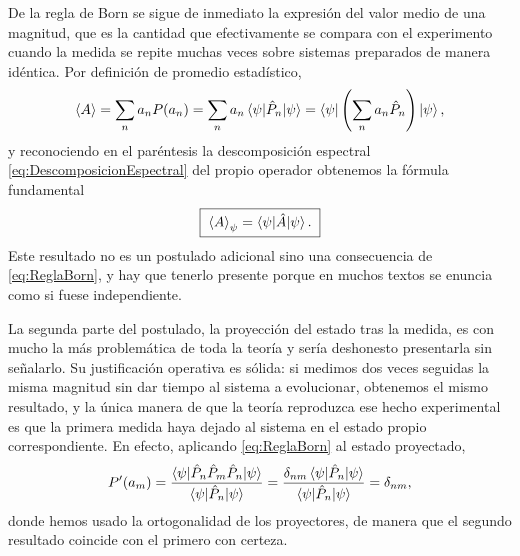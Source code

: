         De la regla de Born se sigue de inmediato la expresión del valor medio de una magnitud, que es la cantidad que efectivamente se compara con el experimento cuando la medida se repite muchas veces sobre sistemas preparados de manera idéntica. Por definición de promedio estadístico,
        \begin{equation}\label{eq:ValorMedio1}
            \left\langle A\right\rangle = \sum_{n} a_{n}P(a_{n}) = \sum_{n}a_{n}\braket{\psi|\hat{P}_{n}|\psi} = \braket{\psi|\left(\sum_{n}a_{n}\hat{P}_{n}\right)|\psi},
        \end{equation}
        y reconociendo en el paréntesis la descomposición espectral \eqref{eq:DescomposicionEspectral} del propio operador obtenemos la fórmula fundamental
        \begin{equation}\label{eq:ValorMedio}
            \boxed{\;\left\langle A\right\rangle_{\psi} = \braket{\psi|\hat{A}|\psi} .\;}
        \end{equation}
        Este resultado no es un postulado adicional sino una consecuencia de \eqref{eq:ReglaBorn}, y hay que tenerlo presente porque en muchos textos se enuncia como si fuese independiente.

        La segunda parte del postulado, la proyección del estado tras la medida, es con mucho la más problemática de toda la teoría y sería deshonesto presentarla sin señalarlo. Su justificación operativa es sólida: si medimos dos veces seguidas la misma magnitud sin dar tiempo al sistema a evolucionar, obtenemos el mismo resultado, y la única manera de que la teoría reproduzca ese hecho experimental es que la primera medida haya dejado al sistema en el estado propio correspondiente. En efecto, aplicando \eqref{eq:ReglaBorn} al estado proyectado,
        \begin{equation}\label{eq:MedidaRepetida}
            P'(a_{m}) = \frac{\braket{\psi|\hat{P}_{n}\hat{P}_{m}\hat{P}_{n}|\psi}}{\braket{\psi|\hat{P}_{n}|\psi}} = \frac{\delta_{nm}\braket{\psi|\hat{P}_{n}|\psi}}{\braket{\psi|\hat{P}_{n}|\psi}} = \delta_{nm},
        \end{equation}
        donde hemos usado la ortogonalidad de los proyectores, de manera que el segundo resultado coincide con el primero con certeza.

